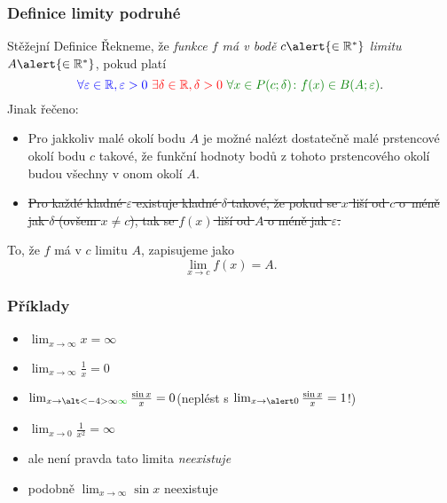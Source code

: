 \documentclass[handout]%
{beamer}
\newcommand{\R}{\mathbb R}
\begin{document}
\begin{frame}
	\frametitle{Definice limity podruhé}
	
	\begin{alertblock}{Stěžejní Definice}
	Řekneme, že \emph{funkce $f$ má v bodě $c \alert{\in \R^*}$ limitu $A \alert{\in \R^*}$}, pokud platí
	\[ \textcolor{blue}{\forall \varepsilon \in \R, \varepsilon>0} \  \textcolor{red}{\exists \delta \in \R, \delta > 0}\  \textcolor{green!50!black}{\forall x \in P(c; \delta)\colon f(x) \in B(A; \varepsilon)}.  \]
	\pause
	Jinak řečeno:\pause
	\begin{itemize}
		\item Pro jakkoliv malé okolí bodu $A$ je možné nalézt dostatečně malé prstencové okolí bodu $c$ takové, že funkční hodnoty bodů z tohoto prstencového okolí budou všechny v onom okolí $A$.\pause
		\item \sout{Pro každé kladné $\varepsilon$ existuje kladné $\delta$ takové, že pokud se $x$ liší od $c$ o~méně jak $\delta$ (ovšem $x \neq c$), tak se $f(x)$ liší od $A$ o méně jak $\varepsilon$.}
	\end{itemize}
	
	\end{alertblock}
	\pause
	To, že $f$ má v $c$ limitu $A$, zapisujeme jako
	\[ \lim_{x \to c} f(x) = A. \]
\end{frame}


\begin{frame}
	\frametitle{Příklady}
	\begin{itemize}\pause
		\everymath{\displaystyle}
		\item $\lim_{x \to \infty} x = \infty$ \pause
		\item $\lim_{x \to \infty} \frac 1x = 0$\pause
		\item $\lim_{x \to \alt<-4>{\infty}{\textcolor{green!75!black}{\infty}}} \frac{\sin x}{x} = 0$\pause\qquad(\alert{neplést s} $\lim_{x \to\alert 0} \frac{\sin x}{x} = 1$!)\pause
		\item $\lim_{x \to 0} \frac 1{x^2} = \infty$\pause
		\item \alert{ale není pravda} \pause\quad tato limita \emph{neexistuje}\pause
		\item podobně $\lim_{x \to \infty} \sin x$ neexistuje
	\end{itemize}

\end{frame}
\end{document}
